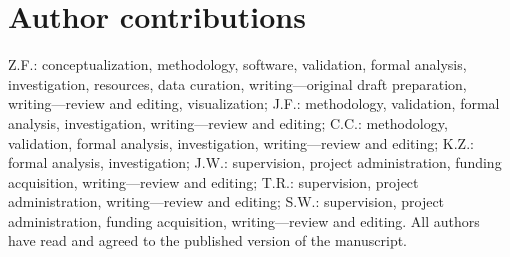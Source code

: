\documentclass[preprint,12pt]{elsarticle}
\begin{document}






\section*{Author contributions}
        Z.F.: conceptualization, methodology, software, validation, formal analysis, investigation, resources, data curation, writing---original draft preparation, writing---review and editing, visualization; J.F.: methodology, validation, formal analysis, investigation, writing---review and editing; C.C.: methodology, validation, formal analysis, investigation, writing---review and editing; K.Z.: formal analysis, investigation; J.W.: supervision, project administration, funding acquisition, writing---review and editing; T.R.: supervision, project administration, writing---review and editing; S.W.: supervision, project administration, funding acquisition, writing---review and editing. All authors have read and agreed to the published version of the manuscript.
\end{document}
